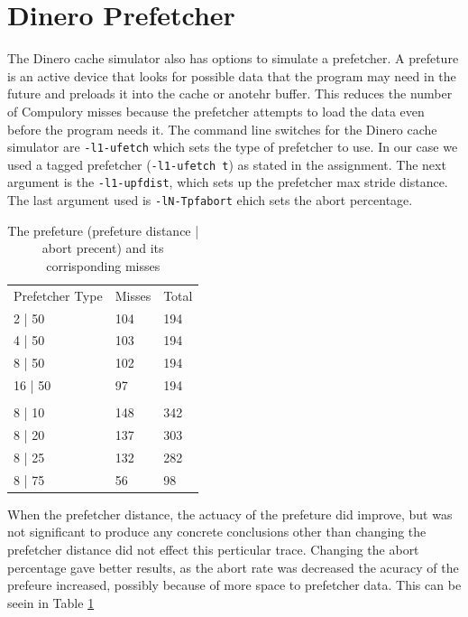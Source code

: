 \documentclass{article}
\begin{document}
	\section{Dinero Prefetcher}
		The Dinero cache simulator also has options to simulate a prefetcher. A prefeture is an active device that looks for possible data that the program may need in the future and preloads it into the cache or anotehr buffer. This reduces the number of Compulory misses because the prefetcher attempts to load the data even before the program needs it. The command line switches for the Dinero cache simulator are \verb|-l1-ufetch| which sets the type of prefetcher to use. In our case we used a tagged prefetcher (\verb|-l1-ufetch t|) as stated in the assignment. The next argument is the \verb|-l1-upfdist|, which sets up the prefetcher max stride distance. The last argument used is \verb|-lN-Tpfabort| ehich sets the abort percentage. 

		\begin{table}[H]
			\centering
			\label{din:prefetch_data}
			\begin{tabular}{lll}
			Prefetcher Type & Misses & Total \\
			2 | 50          & 104    & 194   \\
			4 | 50          & 103    & 194   \\
			8 | 50          & 102    & 194   \\
			16 | 50         & 97     & 194   \\
			& & \\
			8 | 10          & 148    & 342   \\
			8 | 20          & 137    & 303   \\
			8 | 25          & 132    & 282   \\
			8 | 75          & 56     & 98   
			\end{tabular}
			\caption{The prefeture (prefeture distance | abort precent) and its corrisponding misses}
		\end{table}
		When the prefetcher distance, the actuacy of the prefeture did improve, but was not significant to produce any concrete conclusions other than changing the prefetcher distance did not effect this perticular trace. Changing the abort percentage gave better results, as the abort rate was decreased the acuracy of the prefeure increased, possibly because of more space to prefetcher data. This can be seein in Table \ref{din:prefetch_data}
\end{document}
